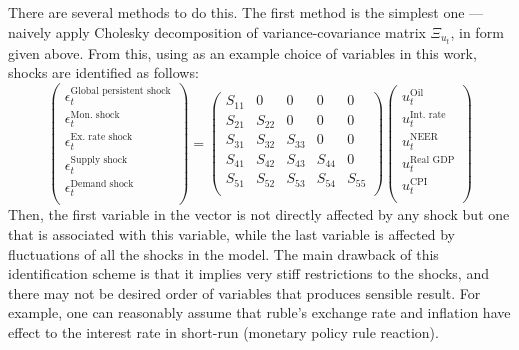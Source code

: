 \documentclass[12pt, a4paper]{extarticle}
\begin{document}
There are several methods to do this. The first method is the simplest one --- naively apply Cholesky decomposition of variance-covariance matrix $\Xi_{u_t}$, in form given above. From this, using as an example choice of variables in this work, shocks are identified as follows:
\begin{equation}
	\begin{pmatrix}
		\epsilon^{\text{Global persistent shock}}_t\\
		\epsilon^{\text{Mon. shock}}_t\\
		\epsilon^{\text{Ex. rate shock}}_t\\
		\epsilon^{\text{Supply shock}}_t\\
		\epsilon^{\text{Demand shock}}_t\\
	\end{pmatrix} = 
	\begin{pmatrix}
		S_{11} & 0 & 0 & 0 & 0 \\
		S_{21} & S_{22} & 0 & 0 & 0\\
		S_{31} & S_{32} & S_{33} & 0 & 0 \\
		S_{41} & S_{42} & S_{43} & S_{44} & 0 \\
		S_{51} & S_{52} & S_{53} & S_{54} & S_{55} \\
	\end{pmatrix} 
	\begin{pmatrix}
		u^{\text{Oil}}_t\\
		u^{\text{Int. rate}}_t\\
		u^{\text{NEER}}_t\\
		u^{\text{Real GDP}}_t\\
		u^{\text{CPI}}_t\\
	\end{pmatrix}
\end{equation}
Then, the first variable in the vector is not directly affected by any shock but one that is associated with this variable, while the last variable is affected by fluctuations of all the shocks in the model. The main drawback of this identification scheme is that it implies very stiff restrictions to the shocks, and there may not be desired order of variables that produces sensible result. For example, one can reasonably assume that ruble's exchange rate and inflation have effect to the interest rate in short-run (monetary policy rule reaction).
\end{document}
